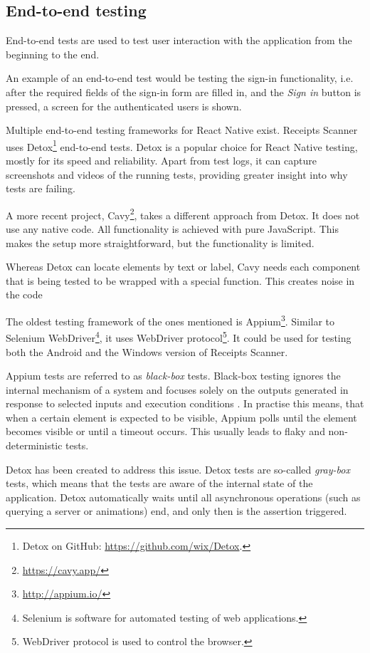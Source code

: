 \documentclass[
  printed, %
  table,   %
  oneside, %
  lof,     %
  lot,     %
]{fithesis3}
\begin{document}
\subsection{End-to-end testing}
\label{sec:end_to_end_testing}
End-to-end tests are used to test user interaction with the application from the beginning to the end. 

An example of an end-to-end test would be testing the sign-in functionality, i.e. after the required fields of the sign-in form are filled in, and the \textit{Sign in} button is pressed, a screen for the authenticated users is shown.

Multiple end-to-end testing frameworks for React Native exist. Receipts Scanner uses Detox\footnote{Detox on GitHub: \url{https://github.com/wix/Detox}.} end-to-end tests. Detox is a popular choice for React Native testing, mostly for its speed and reliability. Apart from test logs, it can capture screenshots and videos of the running tests, providing greater insight into why tests are failing.

A more recent project, Cavy\footnote{\url{https://cavy.app/}}, takes a different approach from Detox. It does not use any native code. All functionality is achieved with pure JavaScript. This makes the setup more straightforward, but the functionality is limited.

Whereas Detox can locate elements by text or label, Cavy needs each component that is being tested to be wrapped with a special function. This creates noise in the code

The oldest testing framework of the ones mentioned is Appium\footnote{\url{http://appium.io/}}. Similar to Selenium WebDriver\footnote{Selenium is software for automated testing of web applications.}, it uses WebDriver protocol\footnote{WebDriver protocol is used to control the browser.}. It could be used for testing both the Android and the Windows version of Receipts Scanner.

Appium tests are referred to as \textit{black-box} tests. Black-box testing ignores the internal mechanism of a system and focuses solely on the outputs generated in response to selected inputs and execution conditions \cite{Gao2003Testing}. In practise this means, that when a certain element is expected to be visible, Appium polls until the element becomes visible or until a timeout occurs. This usually leads to flaky and non-deterministic tests.

Detox has been created to address this issue. Detox tests are so-called \textit{gray-box} tests, which means that the tests are aware of the internal state of the application. Detox automatically waits until all asynchronous operations (such as querying a server or animations) end, and only then is the assertion triggered.
\end{document}
